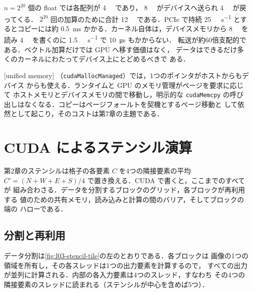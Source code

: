 \documentclass[../main.tex]{subfiles}
\begin{document}
\begin{example}[コピーのコスト]
  \label{ex:l03-copy-cost}
  $n = 2^{20}$ 個の float では各配列が \SI{4}{\mebi\byte} であり，
  \SI{8}{\mebi\byte} がデバイスへ送られ \SI{4}{\mebi\byte} が戻ってくる．
  $2^{20}$ 回の加算のために合計 \SI{12}{\mebi\byte} である．PCIe で持続
  \SI{25}{\giga\byte\per\second} とするとコピーには約
  \SI{0.5}{\milli\second} かかる．カーネル自体は，デバイスメモリから
  \SI{8}{\mebi\byte} を読み \SI{4}{\mebi\byte} を書くのに
  \SI{1.5}{\tera\byte\per\second} で \SI{10}{\micro\second} もかからない．
  転送が約60倍支配的である．ベクトル加算だけでは GPU へ移す価値はなく，
  データはできるだけ多くのカーネルにわたってデバイス上にとどめるべきで
  ある．
\end{example}

\begin{definition}[ユニファイドメモリ]
  [unified memory]
  （\texttt{cudaMallocManaged}）では，1つのポインタがホストからもデバイス
  からも使える．ランタイムと GPU のメモリ管理がページを要求に応じて
  ホストメモリとデバイスメモリの間で移動し，明示的な \texttt{cudaMemcpy}
  の呼び出しはなくなる．コピーはページフォールトを契機とするページ移動と
  して依然として起こり，そのコストは第7章の主題である．
\end{definition}

\section{CUDA によるステンシル演算}
\label{sec:l03-stencil}

第2章のステンシルは格子の各要素 $C$ を4つの隣接要素の平均
$C' = (N + W + E + S)/4$ で置き換える．CUDA で書くと，ここまでのすべてが
組み合わさる．データを分割するブロックのグリッド，各ブロックが再利用する
値のための共有メモリ，読み込みと計算の間のバリア，そしてブロックの端の
ハローである．

\subsection{分割と再利用}

データ分割は\cref{fig:l03-stencil-tile}の左のとおりである．各ブロックは
画像の1つの領域を所有し，その各スレッドは1つの出力要素を計算するので，
すべての出力が並列に計算される．内部の各入力要素は4つのスレッド，すなわち
その4つの隣接要素のスレッドに読まれる（ステンシルが中心を含めば5つ）．
\end{document}
